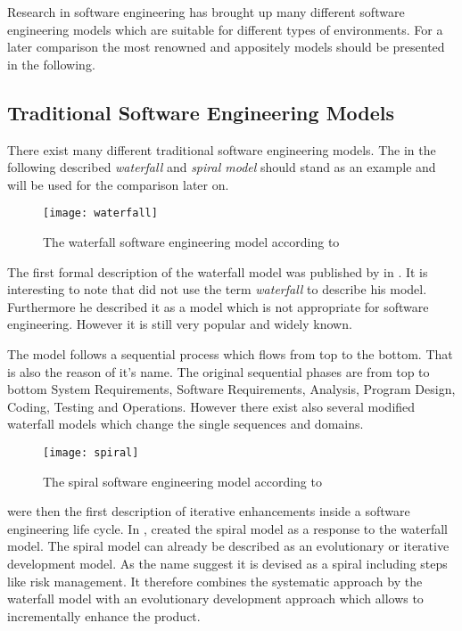 Research in software engineering has brought up many different software
engineering models which are suitable for different types of environments. For
a later comparison the most renowned and appositely models should be presented
in the following.

\subsection{Traditional Software Engineering Models} %

There exist many different traditional software engineering models. The in the
following described \emph{waterfall} and \emph{spiral model} should stand as an
example and will be used for the comparison later on.

\begin{figure}[htbp]
  \centering
  \texttt{[image: waterfall]}
  \caption{The waterfall software engineering model according to \textcite{Royce1970}}
\end{figure}

The first formal description of the waterfall model was published by
\textcite{Royce1970} in \citeyear{Royce1970}. It is interesting to note that
\citeauthor{Royce1970} did not use the term \emph{waterfall} to describe his
model. Furthermore he described it as a model which is not appropriate for
software engineering. However it is still very popular and widely known.

The model follows a sequential process which flows from top to the bottom. That
is also the reason of it's name. The original sequential phases are from top to
bottom System Requirements, Software Requirements, Analysis, Program Design,
Coding, Testing and Operations. However there exist also several modified
waterfall models which change the single sequences and domains.

\begin{figure}[htbp]
  \centering
  \texttt{[image: spiral]}
  \caption{The spiral software engineering model according to \textcite{Boehm1988}}
\end{figure}

\textcite{Basili1975} were then the first description of iterative enhancements
inside a software engineering life cycle. In \citeyear{Boehm1988},
\textcite{Boehm1988} created the spiral model as a response to the waterfall
model. The spiral model can already be described as an evolutionary or
iterative development model. As the name suggest it is devised as a spiral
including steps like risk management. It therefore combines the systematic
approach by the waterfall model with an evolutionary development approach which
allows to incrementally enhance the product.

